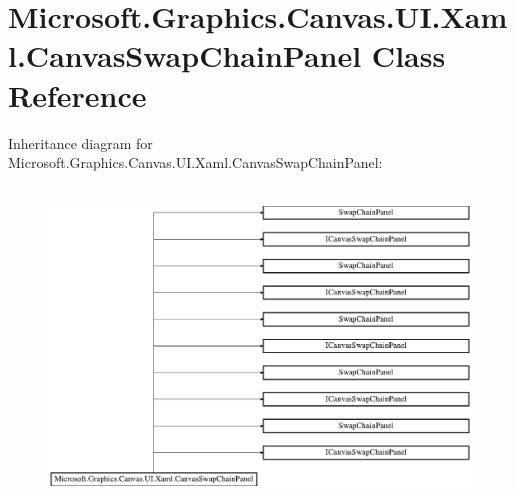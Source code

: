 \hypertarget{class_microsoft_1_1_graphics_1_1_canvas_1_1_u_i_1_1_xaml_1_1_canvas_swap_chain_panel}{}\section{Microsoft.\+Graphics.\+Canvas.\+U\+I.\+Xaml.\+Canvas\+Swap\+Chain\+Panel Class Reference}
\label{class_microsoft_1_1_graphics_1_1_canvas_1_1_u_i_1_1_xaml_1_1_canvas_swap_chain_panel}
Inheritance diagram for Microsoft.\+Graphics.\+Canvas.\+U\+I.\+Xaml.\+Canvas\+Swap\+Chain\+Panel\+:\begin{figure}[H]
\begin{center}
\leavevmode
\includegraphics[height=8.438356cm]{class_microsoft_1_1_graphics_1_1_canvas_1_1_u_i_1_1_xaml_1_1_canvas_swap_chain_panel}
\end{center}
\end{figure}
